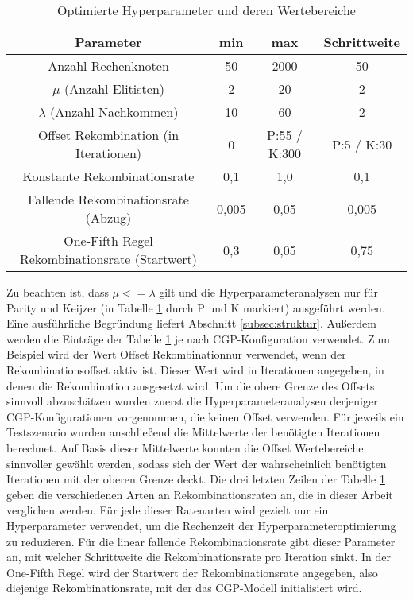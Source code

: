 \begin{table}[H]
	\centering
	\begin{tabular}{c | c | c | c}
		\textbf{Parameter} & \textbf{min} & \textbf{max} & \textbf{Schrittweite}\\
		\hline
		Anzahl Rechenknoten & 50 & 2000 & 50 \\
		\hline
		$\mu$ (Anzahl Elitisten) & 2 & 20 & 2\\
		\hline
		$\lambda$ (Anzahl Nachkommen) & 10 & 60 & 2 \\
		\hline
		Offset Rekombination (in Iterationen)& 0 & P:55 / K:300 & P:5 / K:30\\
		\hline
		Konstante Rekombinationsrate & 0,1 & 1,0 & 0,1\\
		\hline
		Fallende Rekombinationsrate (Abzug) & 0,005 & 0,05 & 0,005\\
		\hline
		One-Fifth Regel Rekombinationsrate (Startwert) & 0,3 & 0,05 & 0,75\\
	\end{tabular}
	\caption{Optimierte Hyperparameter und deren Wertebereiche}
	\label{table:hyperopt}
\end{table}

Zu beachten ist, dass $\mu <= \lambda$ gilt und die Hyperparameteranalysen nur für Parity und Keijzer (in Tabelle \ref{table:hyperopt} durch P und K markiert) ausgeführt werden.
Eine ausführliche Begründung liefert Abschnitt \ref{subsec:struktur}.
Außerdem werden die Einträge der Tabelle \ref{table:hyperopt} je nach CGP-Konfiguration verwendet.
Zum Beispiel wird der Wert \glqq Offset Rekombination\grqq\space nur verwendet, wenn der Rekombinationsoffset aktiv ist. 
Dieser Wert wird in Iterationen angegeben, in denen die Rekombination ausgesetzt wird.
Um die obere Grenze des Offsets sinnvoll abzuschätzen wurden zuerst die Hyperparameteranalysen derjeniger CGP-Konfigurationen vorgenommen, die keinen Offset verwenden.
Für jeweils ein Testszenario wurden anschließend die Mittelwerte der benötigten Iterationen berechnet.
Auf Basis dieser Mittelwerte konnten die Offset Wertebereiche sinnvoller gewählt werden, sodass sich der Wert der wahrscheinlich benötigten Iterationen mit der oberen Grenze deckt.
Die drei letzten Zeilen der Tabelle \ref{table:hyperopt} geben die verschiedenen Arten an Rekombinationsraten an, die in dieser Arbeit verglichen werden.
Für jede dieser Ratenarten wird gezielt nur ein Hyperparameter verwendet, um die Rechenzeit der Hyperparameteroptimierung zu reduzieren.
Für die linear fallende Rekombinationsrate gibt dieser Parameter an, mit welcher Schrittweite die Rekombinationsrate pro Iteration sinkt.
In der One-Fifth Regel wird der Startwert der Rekombinationsrate angegeben, also diejenige Rekombinationsrate, mit der das CGP-Modell initialisiert wird.\\

